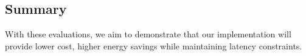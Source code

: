 \subsection{Summary}

With these evaluations, we aim to demonstrate that our implementation will provide lower cost, higher energy savings while maintaining latency constraints.


















%     
